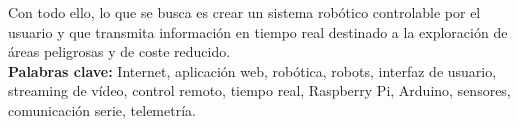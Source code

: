 Con todo ello, lo que se busca es crear un sistema robótico controlable por el usuario y que transmita información en tiempo real destinado a la exploración de áreas peligrosas y 
de coste reducido.\\

\textbf{Palabras clave:} Internet, aplicación web, robótica, robots, interfaz de usuario, streaming de vídeo, control remoto, tiempo real, Raspberry Pi, Arduino, sensores, comunicación serie,
telemetría.\\
